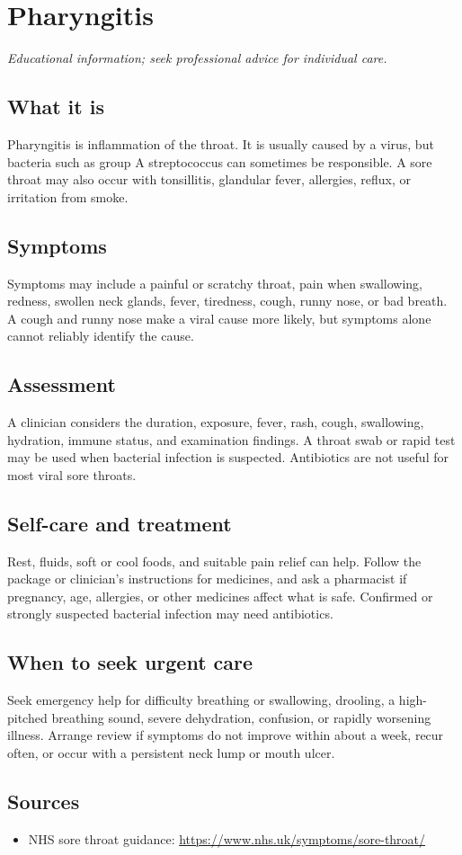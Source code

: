 \chapter{Pharyngitis}

\medskip
\noindent\textit{Educational information; seek professional advice for individual care.}

\section*{What it is}
Pharyngitis is inflammation of the throat. It is usually caused by a virus, but bacteria such as group A streptococcus can sometimes be responsible. A sore throat may also occur with tonsillitis, glandular fever, allergies, reflux, or irritation from smoke.

\section*{Symptoms}
Symptoms may include a painful or scratchy throat, pain when swallowing, redness, swollen neck glands, fever, tiredness, cough, runny nose, or bad breath. A cough and runny nose make a viral cause more likely, but symptoms alone cannot reliably identify the cause.

\section*{Assessment}
A clinician considers the duration, exposure, fever, rash, cough, swallowing, hydration, immune status, and examination findings. A throat swab or rapid test may be used when bacterial infection is suspected. Antibiotics are not useful for most viral sore throats.

\section*{Self-care and treatment}
Rest, fluids, soft or cool foods, and suitable pain relief can help. Follow the package or clinician’s instructions for medicines, and ask a pharmacist if pregnancy, age, allergies, or other medicines affect what is safe. Confirmed or strongly suspected bacterial infection may need antibiotics.

\section*{When to seek urgent care}
Seek emergency help for difficulty breathing or swallowing, drooling, a high-pitched breathing sound, severe dehydration, confusion, or rapidly worsening illness. Arrange review if symptoms do not improve within about a week, recur often, or occur with a persistent neck lump or mouth ulcer.

\section*{Sources}
\begin{itemize}
\item NHS sore throat guidance: \url{https://www.nhs.uk/symptoms/sore-throat/}
\end{itemize}
